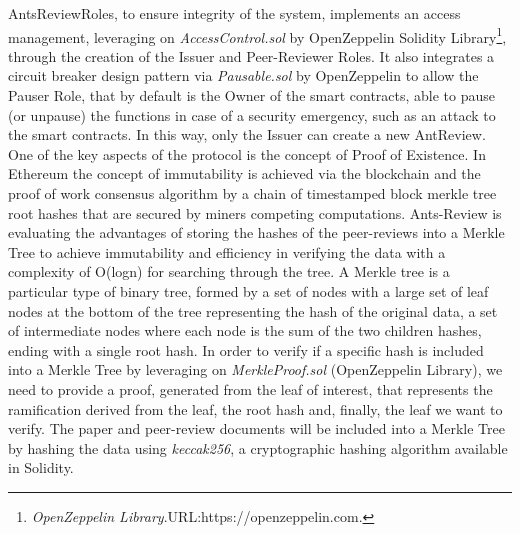 \documentclass[runningheads]{llncs}
\begin{document}
AntsReviewRoles, to ensure integrity of the system, implements an access management, leveraging on \emph{AccessControl.sol} by OpenZeppelin Solidity Library\footnote[8]{\emph{OpenZeppelin Library}.\textsc{URL:}https://openzeppelin.com.}, through the creation of the Issuer and Peer-Reviewer Roles.
\newline It also integrates a circuit breaker design pattern via \emph{Pausable.sol} by OpenZeppelin to allow the Pauser Role, that by default is the Owner of the smart contracts, able to pause (or unpause) the functions in case of a security emergency, such as an attack to the smart contracts. In this way, only the Issuer can create a new AntReview.
\newline One of the key aspects of the protocol is the concept of Proof of Existence. In Ethereum \cite{Ethereum} the concept of immutability is achieved via the blockchain and the proof of work consensus algorithm by a chain of timestamped block merkle tree root hashes that are secured by miners competing computations.
\newline Ants-Review is evaluating the advantages of storing the hashes of the peer-reviews into a Merkle Tree \cite{BayerHaber1992} to achieve immutability and efficiency in verifying the data with a complexity of O(logn) for searching through the tree.
\newline A Merkle tree is a particular type of binary tree, formed by a set of nodes with a large set of leaf nodes at the bottom of the tree representing the hash of the original data, a set of intermediate nodes where each node is the sum of the two children hashes, ending with a single root hash. In order to verify if a specific hash is included into a Merkle Tree by leveraging on \emph{MerkleProof.sol} (OpenZeppelin Library), we need to provide a proof, generated from the leaf of interest, that represents the ramification derived from the leaf, the root hash and, finally, the leaf we want to verify.
\newline The paper and peer-review documents will be included into a Merkle Tree by hashing the data using \emph{keccak256}, a cryptographic hashing algorithm available in Solidity.
\end{document}
